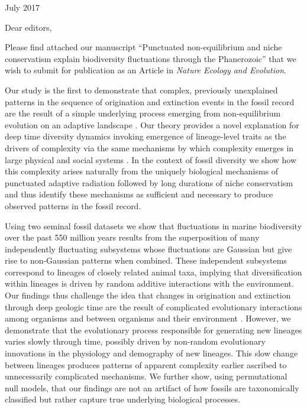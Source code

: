 \documentclass[12pt]{article}
\let\citep=\autocite
\begin{document}
 July 2017

\vspace{2em}

\noindent
Dear editors,
\vspace{2em}

Please find attached our manuscript ``Punctuated non-equilibrium and
niche conservatism explain biodiversity fluctuations through the
Phanerozoic'' that we wish to submit for publication as an Article in
{\it Nature Ecology and Evolution}.

Our study is the first to demonstrate that complex, previously
unexplained patterns in the sequence of origination and extinction
events in the fossil record are the result of a simple underlying
process emerging from non-equilibrium evolution on an adaptive
landscape \citep{eldredgeGould1972, newman1985adaptive}. Our theory
provides a novel explanation for deep time diversity dynamics invoking
emergence of lineage-level traits as the drivers of complexity via the
same mechanisms by which complexity emerges in large physical
\citep{beck2004} and social systems \citep{fuentes2009}. In the context
of fossil diversity we show how this complexity arises naturally from
the uniquely biological mechanisms of punctuated adaptive radiation
\citep{eldredgeGould1972, newman1985adaptive, hopkins2014} followed by
long durations of niche conservatism \citep{ackerly2003, roy2009range,
  hopkins2014} and thus identify these mechanisms as sufficient and
necessary to produce observed patterns in the fossil record.

Using two seminal fossil datasets \citep{sepkoski1992, alroy08} we show
that fluctuations in marine biodiversity over the past 550 million
years results from the superposition of many independently fluctuating
subsystems whose fluctuations are Gaussian but give rise to
non-Gaussian patterns when combined.  These independent subsystems
correspond to lineages of closely related animal taxa, implying that
diversification within lineages is driven by random additive
interactions with the environment. Our findings thus challenge the
idea that changes in origination and extinction through deep geologic
time are the result of complicated evolutionary interactions among
organisms and between organisms and their environment \citep{bak1993,
  sole1997, newman1995}. However, we demonstrate that the evolutionary
process responsible for generating new lineages varies slowly through
time, possibly driven by non-random evolutionary innovations in the
physiology and demography of new lineages. This slow change between
lineages produces patterns of apparent complexity earlier ascribed to
unnecessarily complicated mechanisms. We further show, using
permutational null models, that our findings are not an artifact of how
fossils are taxonomically classified but rather capture true
underlying biological processes.
\end{document}
